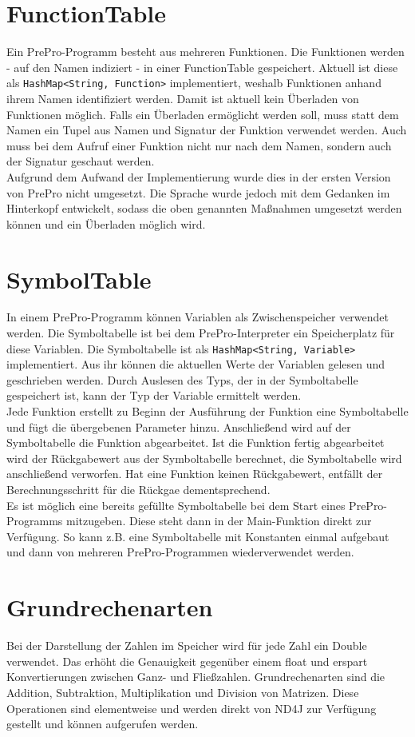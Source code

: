 \section{FunctionTable}
Ein PrePro-Programm besteht aus mehreren Funktionen.
Die Funktionen werden - auf den Namen indiziert - in einer FunctionTable gespeichert.
Aktuell ist diese als \texttt{HashMap<String, Function>} implementiert, weshalb Funktionen anhand ihrem Namen identifiziert werden. 
Damit ist aktuell kein Überladen von Funktionen möglich.
Falls ein Überladen ermöglicht werden soll, muss statt dem Namen ein Tupel aus Namen und Signatur der Funktion verwendet werden.
Auch muss bei dem Aufruf einer Funktion nicht nur nach dem Namen, sondern auch der Signatur geschaut werden.\\
Aufgrund dem Aufwand der Implementierung wurde dies in der ersten Version von PrePro nicht umgesetzt.
Die Sprache wurde jedoch mit dem Gedanken im Hinterkopf entwickelt, sodass die oben genannten Maßnahmen umgesetzt werden können und ein Überladen möglich wird.

\section{SymbolTable}
In einem PrePro-Programm können Variablen als Zwischenspeicher verwendet werden.
Die Symboltabelle ist bei dem PrePro-Interpreter ein Speicherplatz für diese Variablen.
Die Symboltabelle ist als \texttt{HashMap<String, Variable>} implementiert.
Aus ihr können die aktuellen Werte der Variablen gelesen und geschrieben werden.
Durch Auslesen des Typs, der in der Symboltabelle gespeichert ist, kann der Typ der Variable ermittelt werden.\\
Jede Funktion erstellt zu Beginn der Ausführung der Funktion eine Symboltabelle und fügt die übergebenen Parameter hinzu.
Anschließend wird auf der Symboltabelle die Funktion abgearbeitet.
Ist die Funktion fertig abgearbeitet wird der Rückgabewert aus der Symboltabelle berechnet, die Symboltabelle wird anschließend verworfen.
Hat eine Funktion keinen Rückgabewert, entfällt der Berechnungsschritt für die Rückgae dementsprechend.
\\
Es ist möglich eine bereits gefüllte Symboltabelle bei dem Start eines PrePro-Programms mitzugeben.
Diese steht dann in der Main-Funktion direkt zur Verfügung.
So kann z.B. eine Symboltabelle mit Konstanten einmal aufgebaut und dann von mehreren PrePro-Programmen wiederverwendet werden.

\section{Grundrechenarten}
Bei der Darstellung der Zahlen im Speicher wird für jede Zahl ein Double verwendet.
Das erhöht die Genauigkeit gegenüber einem float und erspart Konvertierungen zwischen Ganz- und Fließzahlen.
Grundrechenarten sind die Addition, Subtraktion, Multiplikation und Division von Matrizen.
Diese Operationen sind elementweise und werden direkt von ND4J zur Verfügung gestellt und können aufgerufen werden.

